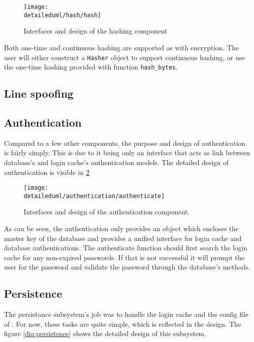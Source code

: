 \begin{figure}[H]
    \centering
    \centerline{\texttt{[image: \\detaileduml/hash/hash]}}
    \caption{Interfaces and design of the hashing component}
    \label{dia:hash_design}
\end{figure}

Both one-time and continuous hashing are supported as with encryption. The user
will either construct a \texttt{Hasher} object to support continuous hashing, or
use the one-time hashing provided with function \texttt{hash\_bytes}.

\subsection{Line spoofing}

\subsection{Authentication}

Compared to a few other components, the purpose and design of authentication is
fairly simply. This is due to it being only an interface that acts as link
between database's and login cache's authentication models. The detailed design
of authentication is visible in \ref{dia:auth_design}

\begin{figure}[H]
    \centering
    \centerline{\texttt{[image: \\detaileduml/authentication/authenticate]}}
    \caption{Interfaces and design of the authentication component.}
    \label{dia:auth_design}
\end{figure}

As can be seen, the authentication only provides an object which encloses the
master key of the database and provides a unified interface for login cache and
database authentications. The authenticate function should first search the
login cache for any non-expired passwords. If that is not successful it
will prompt the user for the password and validate the password through the
database's methods.

\subsection{Persistence}

The persistance subsystem's job was to handle the login cache and the config
file of \pman. For now, these tasks are quite simple, which is reflected in the
design. The figure \ref{dia:persistence} shows the detailed design of this
subsystem.

